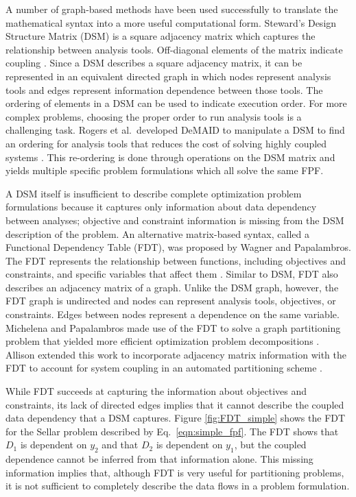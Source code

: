     A number of graph-based methods have been used successfully to translate the 
    mathematical syntax into a more useful computational form. 
    Steward's Design Structure Matrix (DSM) is a square adjacency matrix which captures the relationship between analysis tools.
    Off-diagonal elements of the matrix indicate coupling \cite{Steward1981}. Since a DSM describes a square adjacency matrix, 
    it can be represented in an equivalent directed graph in which nodes represent analysis tools and 
    edges represent information dependence between those tools. The ordering of elements in a DSM can be used to indicate 
    execution order.  For more complex problems, choosing the proper order to run analysis tools is a challenging task. 
    Rogers et al.~developed DeMAID to manipulate a DSM to find an ordering for analysis tools that 
    reduces the cost of solving highly coupled systems \cite{rogers1996,rogers1996demaid}. This re-ordering is done through 
    operations on the DSM matrix and yields multiple specific problem 
    formulations which all solve the same FPF. 
    
    A DSM itself is insufficient to describe complete optimization problem formulations because it 
    captures only information about data dependency between analyses; objective and 
    constraint information is missing from the DSM description of the problem. 
    An alternative matrix-based syntax, called a Functional Dependency Table (FDT), was proposed by Wagner and Papalambros. 
    The FDT represents the relationship between functions, including objectives and constraints, and specific variables that affect 
    them \cite{Wagner1993}. Similar to DSM, FDT also describes an adjacency matrix of a graph. Unlike the DSM graph, 
    however, the FDT graph is undirected and nodes can represent analysis tools, objectives, 
    or constraints. Edges between nodes represent a dependence on the same 
    variable. Michelena and Papalambros made use of the FDT to solve a graph partitioning problem that yielded 
    more efficient optimization problem decompositions \cite{Michelena1997}. Allison 
    extended this work to incorporate adjacency matrix information with the FDT to 
    account for system coupling in an automated partitioning scheme \cite{Allison2008}. 

While FDT succeeds at capturing the 
    information about objectives and constraints, its lack of directed edges 
    implies that it cannot describe the coupled data dependency that a DSM captures. 
Figure \ref{fig:FDT_simple}  shows the FDT for the Sellar problem described by Eq.~\ref{eqn:simple_fpf}.
    The FDT shows that $D_1$ is dependent on $y_2$ and 
    that $D_2$ is dependent on $y_1$, but the coupled dependence cannot be inferred from 
    that information alone. This missing information implies 
    that, although FDT is very useful for partitioning problems, it is not 
    sufficient to completely describe the data flows in a problem formulation. 

